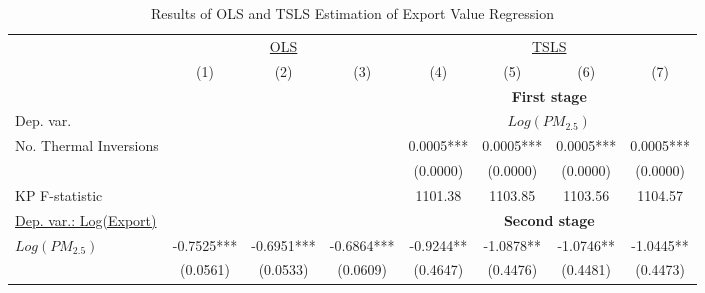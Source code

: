 \documentclass[12pt]{article}
\begin{document}
  \begin{table}[H]\centering
    \caption{Results of OLS and TSLS Estimation of Export Value Regression}\label{tab:main_results}
    \resizebox{\textwidth}{!}
    {
    \begin{tabular}{l*{7}{c}}
      \hline\hline
                          &\multicolumn{3}{c}{\underline{OLS}}&\multicolumn{4}{c}{\underline{TSLS}}\\
                          &\multicolumn{1}{c}{(1)}&\multicolumn{1}{c}{(2)}&\multicolumn{1}{c}{(3)}&\multicolumn{1}{c}{(4)}&\multicolumn{1}{c}{(5)}&\multicolumn{1}{c}{(6)}&\multicolumn{1}{c}{(7)}\\
                          &&&&\multicolumn{4}{c}{\textbf{First stage}}    \\
      Dep. var.  &&&&\multicolumn{4}{c}{$Log(PM_{2.5})$}\\                 
      \hline
      No. Thermal Inversions&             &             && 0.0005***   &0.0005***&0.0005*** & 0.0005***\\
                           &             &              && (0.0000)    &(0.0000)&(0.0000)&(0.0000)\\
      KP F-statistic        &             &             && 1101.38     & 1103.85&1103.56&1104.57\\
      \underline{Dep. var.: Log(Export)} &&&&\multicolumn{4}{c}{\textbf{Second stage}}\\
      $Log(PM_{2.5})$      & -0.7525***  & -0.6951***& -0.6864*** &-0.9244** & -1.0878**&-1.0746**& -1.0445**\\
                           &  (0.0561)   &(0.0533)& (0.0609)  &  (0.4647)  & (0.4476)&(0.4481)& (0.4473)        \\


\end{tabular}}
\end{table}
\end{document}
